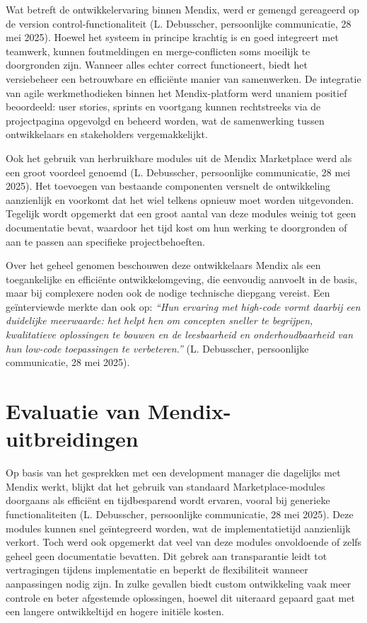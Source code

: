 Wat betreft de ontwikkelervaring binnen Mendix, werd er gemengd gereageerd op de version control-functionaliteit (L. Debusscher, persoonlijke communicatie, 28 mei 2025). Hoewel het systeem in principe krachtig is en goed integreert met teamwerk, kunnen foutmeldingen en merge-conflicten soms moeilijk te doorgronden zijn. Wanneer alles echter correct functioneert, biedt het versiebeheer een betrouwbare en efficiënte manier van samenwerken. De integratie van agile werkmethodieken binnen het Mendix-platform werd unaniem positief beoordeeld: user stories, sprints en voortgang kunnen rechtstreeks via de projectpagina opgevolgd en beheerd worden, wat de samenwerking tussen ontwikkelaars en stakeholders vergemakkelijkt.

Ook het gebruik van herbruikbare modules uit de Mendix Marketplace werd als een groot voordeel genoemd (L. Debusscher, persoonlijke communicatie, 28 mei 2025). Het toevoegen van bestaande componenten versnelt de ontwikkeling aanzienlijk en voorkomt dat het wiel telkens opnieuw moet worden uitgevonden. Tegelijk wordt opgemerkt dat een groot aantal van deze modules weinig tot geen documentatie bevat, waardoor het tijd kost om hun werking te doorgronden of aan te passen aan specifieke projectbehoeften. 

Over het geheel genomen beschouwen deze ontwikkelaars Mendix als een toegankelijke en efficiënte ontwikkelomgeving, die eenvoudig aanvoelt in de basis, maar bij complexere noden ook de nodige technische diepgang vereist. Een geïnterviewde merkte dan ook op: \textit{“Hun ervaring met high-code vormt daarbij een duidelijke meerwaarde: het helpt hen om concepten sneller te begrijpen, kwalitatieve oplossingen te bouwen en de leesbaarheid en onderhoudbaarheid van hun low-code toepassingen te verbeteren.”} (L. Debusscher, persoonlijke communicatie, 28 mei 2025).

\section{Evaluatie van Mendix-uitbreidingen}
Op basis van het gesprekken met een development manager die dagelijks met Mendix werkt, blijkt dat het gebruik van standaard Marketplace-modules doorgaans als efficiënt en tijdbesparend wordt ervaren, vooral bij generieke functionaliteiten (L. Debusscher, persoonlijke communicatie, 28 mei 2025). Deze modules kunnen snel geïntegreerd worden, wat de implementatietijd aanzienlijk verkort. Toch werd ook opgemerkt dat veel van deze modules onvoldoende of zelfs geheel geen documentatie bevatten. Dit gebrek aan transparantie leidt tot vertragingen tijdens implementatie en beperkt de flexibiliteit wanneer aanpassingen nodig zijn. In zulke gevallen biedt custom ontwikkeling vaak meer controle en beter afgestemde oplossingen, hoewel dit uiteraard gepaard gaat met een langere ontwikkeltijd en hogere initiële kosten.

